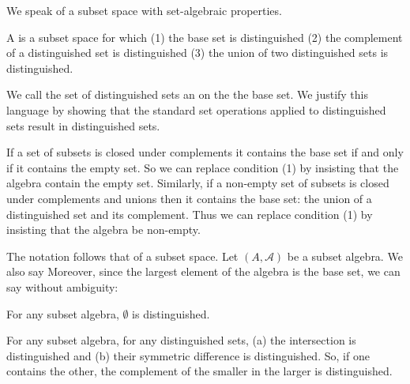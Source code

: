 
\sbasic














\sstart
{}


We speak of a subset space
with set-algebraic
properties.


A 
is a subset space for which
(1) the base set is distinguished
(2) the complement of a distinguished
set is distinguished
(3) the union of two distinguished sets
is distinguished.

We call the set of distinguished sets
an  on the the base set.
We justify this
language by showing that the standard set
operations applied to distinguished sets
result in distinguished sets.

If a set of subsets is closed under complements
it contains the base set
if and only if
it contains the empty set.
So we can replace condition (1) by insisting
that the algebra contain the empty set.
Similarly, if a non-empty set of subsets
is closed under complements and unions
then it contains the base set: the union
of a distinguished set and its complement.
Thus we can replace condition (1) by insisting
that the algebra be non-empty.


The notation follows that of a subset space.
Let $(A, \mathcal{A})$ be a subset algebra.
We also say 
Moreover, since the largest element of the
algebra is the base set, we can say without
ambiguity: 


\begin{prop}
  For any subset algebra, $\emptyset$ is distinguished.
\end{prop}

\begin{prop}
  For any subset algebra,
  for any distinguished sets,
  (a) the intersection is distinguished and
  (b) their symmetric difference is distinguished.
  So, if one contains the other, the complement
  of the smaller in the larger is distinguished.
\end{prop}

